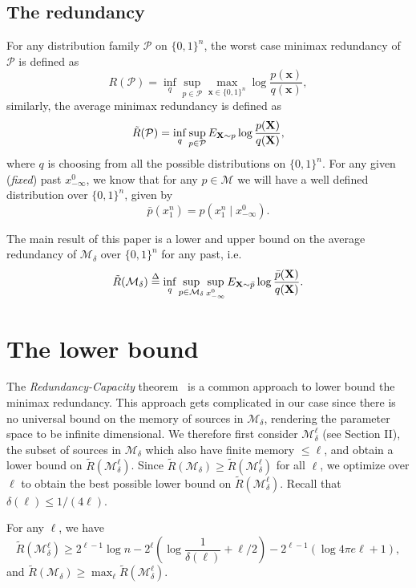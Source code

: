 \documentclass[conference,a4paper]{article}
\newcommand{\x}{\textbf{x}}
\newcommand{\M}{\mathcal{M}}
\begin{document}
\subsection{The redundancy}
For any distribution family $\mathcal{P}$ on $\{0,1\}^n$, the worst case minimax redundancy of $\mathcal{P}$ is defined as
$$R(\mathcal{P})=\inf_{q}\sup_{p\in\mathcal{P}}\max_{\x\in\{0,1\}^n}\log\frac{p(\x)}{q(\x)},$$similarly, the average minimax redundancy is defined as
$$\tilde{R}(\mathcal{P})=\inf_q\sup_{p\in \mathcal{P}}E_{{\mathbf X}\sim p}\log\frac{p({\mathbf X})}{q({\mathbf X})},$$where $q$ is choosing from all the possible distributions on $\{0,1\}^n$. For any given (\emph{fixed}) past $x_{-\infty}^0$, we know that for any $p\in \M$ we will have a well defined distribution over $\{0,1\}^n$, given by
\[
\bar{p}(x_1^n)=p(x_1^n\mid x_{-\infty}^0).
\] 
The main result of this paper is a lower and upper bound on the average redundancy of $\M_{\delta}$ over $\{0,1\}^n$ for any  past, i.e.
$$\tilde{R}(\M_{\delta})\overset{\Delta}{=}\inf_q\sup_{p\in \M_{\delta}}\sup_{x_{-\infty}^0}E_{\X\sim \bar{p}}\log\frac{\bar{p}(\X)}{q(\X)}.$$
\section{The lower bound}
\label{s:lb}
The \emph{Redundancy-Capacity} theorem~\cite{csiszar2004information}
is a common approach to lower bound the minimax redundancy. This approach gets complicated in our case since there is no
universal bound on the memory of sources in $\M_{\delta}$, rendering
the parameter space to be infinite dimensional. We
therefore first consider $\M^{\ell}_\delta$ (see Section II), the
subset of sources in $\M_\delta$ which also have finite memory
$\le \ell$, and obtain a lower bound on
$\tilde{R}(\M^{\ell}_{\delta})$. Since
$\tilde{R}(\M_{\delta})\ge \tilde{R}(\M^{\ell}_{\delta})$ for all
$\ell$, we optimize over $\ell$ to obtain the best possible lower
bound on $\tilde{R}(\M^{\ell}_{\delta})$. Recall that
$\delta(\ell)\le 1/(4\ell)$.

\label{thm:lb} For any $\ell$, we have
\[
\tilde{R}(\M_{\delta}^{\ell})
\ge 
2^{\ell-1}\log n-2^\ell(\log \frac1{\delta(\ell)}+ \ell/2)-2^{\ell-1}(\log 4\pi e\ell+1),
\]
and $\tilde{R}(\M_{\delta})\ge \max_{\ell}\tilde{R}(\M_{\delta}^{\ell})$.
\ignore{Thus
\begin{align*}
\tilde{R}(\M_{\delta})&\ge \max_{\ell}\tilde{R}(\M_{\delta}^{\ell})\\
&=\max_{\ell}2^{\ell-1}\log n
-2^{\ell}\left(\log\frac{1}{\delta(\ell)}+(1+o_\ell(1))\ell/2\right).
\end{align*}}
\eTheorem
\end{document}
